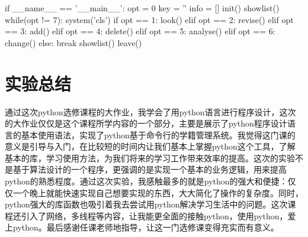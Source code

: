 \documentclass{article}
\begin{document}
\begin{python}
if __name__ == '__main__':
    opt = 0
    key = ''
    info = []
    init()
    showlist()
    while(opt != 7):
        system('cls')
        if opt == 1:
            look()
        elif opt == 2:
            revise()
        elif opt == 3:
            add()
        elif opt == 4:
            delete()
        elif opt == 5:
            analyse()
        elif opt == 6:
            change()
        else:
            break
        showlist()
    leave()

\end{python}

\newpage
\section{实验总结}

通过这次python选修课程的大作业，我学会了用python语言进行程序设计，这次的大作业仅仅是这个课程所学内容的一个部分，主要是展示了python程序设计语言的基本使用语法，实现了python基于命令行的学籍管理系统。我觉得这门课的意义是引导与入门，在比较短的时间内让我们基本上掌握python这个工具，了解基本的库，学习使用方法，为我们将来的学习工作带来效率的提高。这次的实验不是基于算法设计的一个程序，更强调的是实现一个基本的业务逻辑，用来提高python的熟悉程度。通过这次实验，我感触最多的就是python的强大和便捷：仅仅一个晚上就能快速实现自己想要实现的东西，大大简化了操作的复杂度。同时，python强大的库函数也吸引着我去尝试用python解决学习生活中的问题。这次课程还引入了网络，多线程等内容，让我能更全面的接触python，使用python，爱上python。最后感谢任课老师地指导，让这一门选修课变得充实而有意义。
\end{document}
